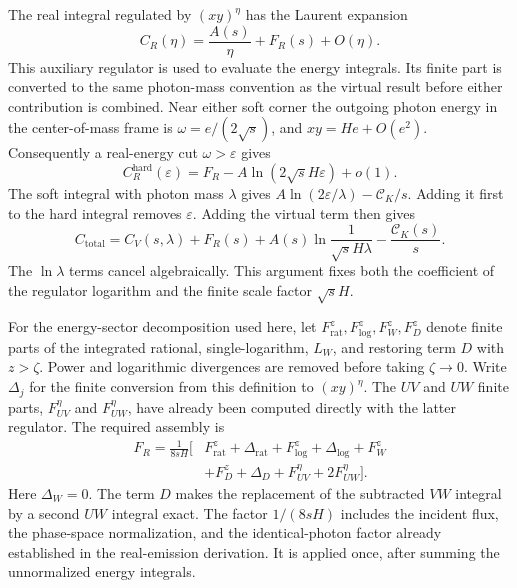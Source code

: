 The real integral regulated by $(xy)^\eta$ has the Laurent expansion
\begin{equation}
 C_R(\eta)=\frac{A(s)}\eta+F_R(s)+O(\eta).
 \label{eq:comp-assembly-real-laurent}
\end{equation}
This auxiliary regulator is used to evaluate the energy integrals.
Its finite part is converted to the same photon-mass convention as
the virtual result before either contribution is combined.
Near either soft corner the outgoing photon energy in the center-of-mass
frame is $\omega=e/(2\sqrt s)$, and $xy=He+O(e^2)$.
Consequently a real-energy cut $\omega>\varepsilon$ gives
\begin{equation}
 C_R^{\mathrm{hard}}(\varepsilon)
 =F_R-A\ln(2\sqrt s H\varepsilon)+o(1).
\end{equation}
The soft integral with photon mass $\lambda$ gives
$A\ln(2\varepsilon/\lambda)-\mathcal C_K/s$. Adding it first to the hard
integral removes $\varepsilon$. Adding the virtual term then gives
\begin{equation}
 C_{\mathrm{total}}
 =C_V(s,\lambda)+F_R(s)
   +A(s)\ln\frac1{\sqrt s H\lambda}-\frac{\mathcal C_K(s)}s.
 \label{eq:comp-assembly-common-regulator}
\end{equation}
The $\ln\lambda$ terms cancel algebraically. This argument fixes
both the coefficient of the regulator logarithm and the finite
scale factor $\sqrt s H$.

For the energy-sector decomposition used here, let
$F_{\mathrm{rat}}^z,F_{\log}^z,F_W^z,F_D^z$ denote finite parts
of the integrated rational, single-logarithm, $L_W$, and restoring
term $D$ with $z>\zeta$. Power and logarithmic divergences are
removed before taking $\zeta\to0$. Write $\Delta_j$ for the finite
conversion from this definition to $(xy)^\eta$. The $UV$ and $UW$
finite parts, $F_{UV}^{\eta}$ and $F_{UW}^{\eta}$, have already
been computed directly with the latter regulator. The required
assembly is
\begin{equation}
 \begin{aligned}
 F_R=\frac1{8sH}\big[&F_{\mathrm{rat}}^z+\Delta_{\mathrm{rat}}
       +F_{\log}^z+\Delta_{\log}+F_W^z\\
       &+F_D^z+\Delta_D+F_{UV}^{\eta}+2F_{UW}^{\eta}\big].
 \end{aligned}
 \label{eq:comp-assembly-real-sectors}
\end{equation}
Here $\Delta_W=0$. The term $D$ makes the replacement of the
subtracted $VW$ integral by a second $UW$ integral exact.
The factor $1/(8sH)$ includes the incident flux, the phase-space
normalization, and the identical-photon factor already established
in the real-emission derivation. It is applied once, after summing
the unnormalized energy integrals.

